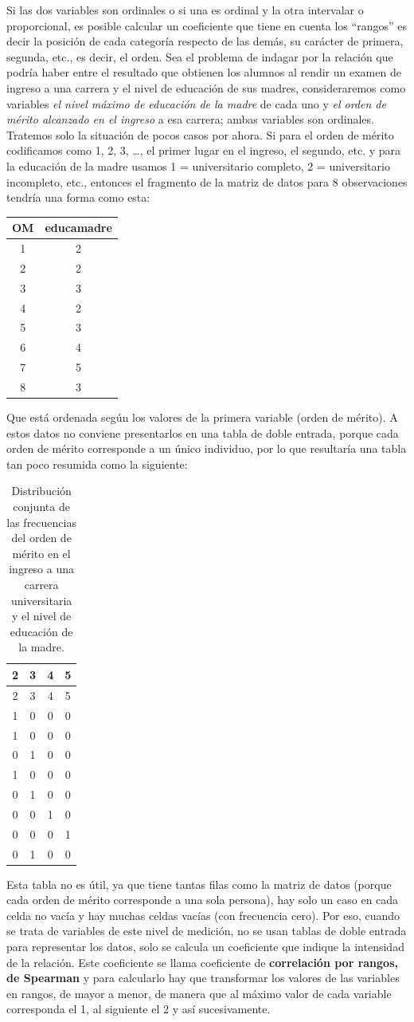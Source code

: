 \documentclass[]{book}
\begin{document}
Si las dos variables son ordinales o si una es ordinal y la otra
intervalar o proporcional, es posible calcular un coeficiente que tiene
en cuenta los ``rangos'' es decir la posición de cada categoría respecto
de las demás, su carácter de primera, segunda, etc., es decir, el orden.
Sea el problema de indagar por la relación que podría haber entre el
resultado que obtienen los alumnos al rendir un examen de ingreso a una
carrera y el nivel de educación de sus madres, consideraremos como
variables \emph{el nivel máximo de educación de la madre} de cada uno y \emph{el orden de mérito alcanzado en el ingreso} a esa carrera; ambas variables
son ordinales. Tratemos solo la situación de pocos casos por ahora. Si
para el orden de mérito codificamos como 1, 2, 3, \ldots{}, el primer lugar en el
ingreso, el segundo, etc. y para la educación de la madre usamos 1 =
universitario completo, 2 = universitario incompleto, etc., entonces el
fragmento de la matriz de datos para 8 observaciones tendría una forma
como esta:

\begin{longtable}[]{@{}cc@{}}
\toprule
OM & educamadre\tabularnewline
\midrule
\endhead
1 & 2\tabularnewline
2 & 2\tabularnewline
3 & 3\tabularnewline
4 & 2\tabularnewline
5 & 3\tabularnewline
6 & 4\tabularnewline
7 & 5\tabularnewline
8 & 3\tabularnewline
\bottomrule
\end{longtable}

Que está ordenada según los valores de la primera variable (orden de
mérito). A estos datos no conviene presentarlos en una tabla de doble entrada, porque cada orden de mérito corresponde a un único individuo, por lo que resultaría una tabla tan poco resumida como la siguiente:

\begin{longtable}[]{@{}cccc@{}}
\caption{\label{tab:unnamed-chunk-141}Distribución conjunta de las frecuencias del orden de mérito en el ingreso a una carrera universitaria y el nivel de educación de la madre.}\tabularnewline
\toprule
2 & 3 & 4 & 5\tabularnewline
\midrule
\endfirsthead
\toprule
2 & 3 & 4 & 5\tabularnewline
\midrule
\endhead
1 & 0 & 0 & 0\tabularnewline
1 & 0 & 0 & 0\tabularnewline
0 & 1 & 0 & 0\tabularnewline
1 & 0 & 0 & 0\tabularnewline
0 & 1 & 0 & 0\tabularnewline
0 & 0 & 1 & 0\tabularnewline
0 & 0 & 0 & 1\tabularnewline
0 & 1 & 0 & 0\tabularnewline
\bottomrule
\end{longtable}

Esta tabla no es útil, ya que tiene tantas filas como la matriz de datos (porque cada orden de mérito corresponde a una sola persona), hay solo un caso en cada celda no vacía y hay muchas celdas vacías (con frecuencia cero). Por eso, cuando se trata de variables de este nivel de medición, no se usan tablas de doble entrada para representar los datos, solo se calcula un coeficiente que indique la intensidad de la relación. Este coeficiente se llama coeficiente de \textbf{correlación por rangos, de Spearman} y para calcularlo hay que transformar los valores de las variables en rangos, de mayor a menor, de manera que al máximo valor de cada variable corresponda el 1, al siguiente el 2 y así sucesivamente.
\end{document}
